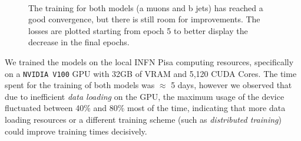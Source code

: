 \begin{figure}
    \myfloatalign
     \\
    \caption[Models losses]{The training for both models (a muons and b jets) has reached a good convergence, but there is still room for improvements. The losses are plotted starting from epoch 5 to better display the decrease in the final epochs.}\label{fig:losses}
    
\end{figure}

We trained the models on the local INFN Pisa computing resources, specifically on a \texttt{NVIDIA V100} GPU with 32GB of VRAM and 5,120 CUDA Cores. The time spent for the training of both models was $\approx$ 5 days, however we observed that due to inefficient \emph{data loading} on the GPU, the maximum usage of the device fluctuated between 40$\%$ and 80$\%$ most of the time, indicating that more data loading resources or a different training scheme (such as \emph{distributed training}) could improve training times decisively.

